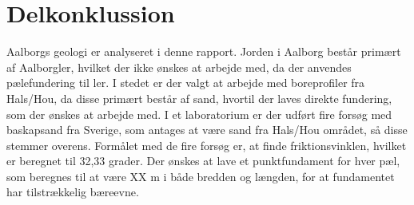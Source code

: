 \section{Delkonklussion}
Aalborgs geologi er analyseret i denne rapport. Jorden i Aalborg består primært af Aalborgler, hvilket der ikke ønskes at arbejde med, da der anvendes pælefundering til ler. I stedet er der valgt at arbejde med boreprofiler fra Hals/Hou, da disse primært består af sand, hvortil der laves direkte fundering, som der ønskes at arbejde med. I et laboratorium er der udført fire forsøg med baskapsand fra Sverige, som antages at være sand fra Hals/Hou området, så disse stemmer overens. Formålet med de fire forsøg er, at finde friktionsvinklen, hvilket er beregnet til 32,33 grader. Der ønskes at lave et punktfundament for hver pæl, som beregnes til at være XX m i både bredden og længden, for at fundamentet har tilstrækkelig bæreevne.